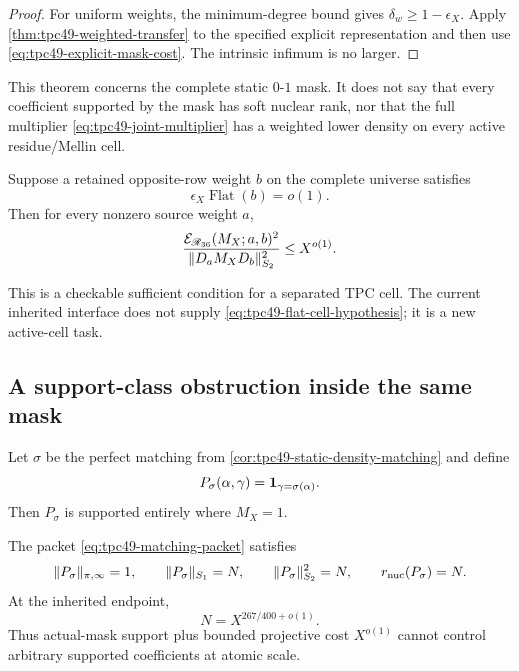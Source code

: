 \begin{proof}
For uniform weights, the minimum-degree bound gives
\(\delta_w\ge1-\epsilon_X\).  Apply
\cref{thm:tpc49-weighted-transfer} to the specified explicit
representation and then use \eqref{eq:tpc49-explicit-mask-cost}.
The intrinsic infimum is no larger.
\end{proof}

This theorem concerns the complete static \(0\)-\(1\) mask.  It does
not say that every coefficient supported by the mask has soft nuclear
rank, nor that the full multiplier
\eqref{eq:tpc49-joint-multiplier} has a weighted lower density on every
active residue/Mellin cell.

\begin{corollary}
\label{cor:tpc49-pruned-cell}
Suppose a retained opposite-row weight \(b\) on the complete universe
satisfies
\begin{equation}
 \epsilon_X\operatorname{Flat}(b)=o(1).
 \label{eq:tpc49-flat-cell-hypothesis}
\end{equation}
Then for every nonzero source weight \(a\),
\begin{equation}
 \frac{\mathcal E_{\mathscr R_{36}}(M_X;a,b)^2}
 {\|D_aM_XD_b\|_{S_2}^2}
 \le X^{o(1)}.
 \label{eq:tpc49-flat-cell-conclusion}
\end{equation}
\end{corollary}

This is a checkable sufficient condition for a separated TPC cell.
The current inherited interface does not supply
\eqref{eq:tpc49-flat-cell-hypothesis}; it is a new active-cell task.

\subsection{A support-class obstruction inside the same mask}

Let \(\sigma\) be the perfect matching from
\cref{cor:tpc49-static-density-matching} and define
\begin{equation}
 P_\sigma(\alpha,\gamma)=\mathbf 1_{\gamma=\sigma(\alpha)}.
 \label{eq:tpc49-matching-packet}
\end{equation}
Then \(P_\sigma\) is supported entirely where \(M_X=1\).

\begin{theorem}
\label{thm:tpc49-mask-support-witness}
The packet \eqref{eq:tpc49-matching-packet} satisfies
\begin{equation}
 \|P_\sigma\|_{\pi,\infty}=1,
 \qquad
 \|P_\sigma\|_{S_1}=N,
 \qquad
 \|P_\sigma\|_{S_2}^2=N,
 \qquad
 r_{\rm nuc}(P_\sigma)=N.
 \label{eq:tpc49-matching-witness-data}
\end{equation}
At the inherited endpoint,
\begin{equation}
 N=X^{267/400+o(1)}.
 \label{eq:tpc49-matching-witness-endpoint}
\end{equation}
Thus actual-mask support plus bounded projective cost
\(X^{o(1)}\) cannot control arbitrary supported coefficients at atomic
scale.
\end{theorem}

